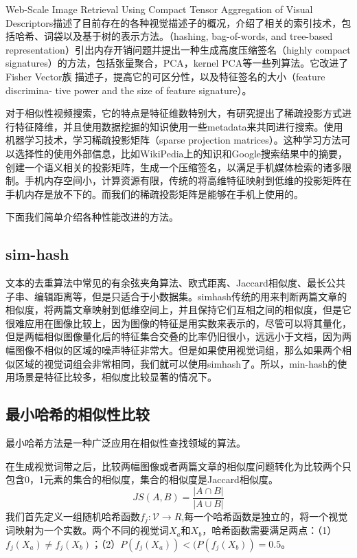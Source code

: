 Web-Scale Image Retrieval Using Compact Tensor Aggregation of Visual Descriptors\cite{Negrel:2013ur}描述了目前存在的各种视觉描述子的概况，介绍了相关的索引技术，包括哈希、词袋以及基于树的表示方法。（hashing, bag-of-words, and tree-based representation）引出内存开销问题并提出一种生成高度压缩签名（highly compact signatures）的方法，包括张量聚合，PCA，kernel PCA等一些列算法。它改进了Fisher Vector族 描述子，提高它的可区分性，以及特征签名的大小（feature discrimina- tive power and the size of feature signature）。

对于相似性视频搜索，它的特点是特征维数特别大，有研究提出了稀疏投影方式进行特征降维，并且使用数据挖掘的知识使用一些metadata来共同进行搜索\cite{Wu:2013tb}。使用机器学习技术，学习稀疏投影矩阵（sparse projection matrices）。这种学习方法可以选择性的使用外部信息，比如WikiPedia上的知识和Google搜索结果中的摘要，创建一个语义相关的投影矩阵，生成一个压缩签名，以满足手机媒体检索的诸多限制。手机内存空间小，计算资源有限，传统的将高维特征映射到低维的投影矩阵在手机内存是放不下的。而我们的稀疏投影矩阵是能够在手机上使用的。

下面我们简单介绍各种性能改进的方法。

\subsection{sim-hash}
文本的去重算法中常见的有余弦夹角算法、欧式距离、Jaccard相似度、最长公共子串、编辑距离等，但是只适合于小数据集。simhash传统的用来判断两篇文章的相似度，将两篇文章映射到低维空间上，并且保持它们互相之间的相似度，但是它很难应用在图像比较上，因为图像的特征是用实数来表示的，尽管可以将其量化，但是两幅相似图像量化后的特征集合交叠的比率仍旧很小，远远小于文档，因为两幅图像不相似的区域的噪声特征非常大。但是如果使用视觉词组，那么如果两个相似区域的视觉词组会非常相同，我们就可以使用simhash了。所以，min-hash的使用场景是特征比较多，相似度比较显著的情况下。

\subsection{最小哈希的相似性比较}
最小哈希方法是一种广泛应用在相似性查找领域的算法。

在生成视觉词带之后，比较两幅图像或者两篇文章的相似度问题转化为比较两个只包含0，1元素的集合的相似度，集合的相似度是Jaccard相似度。
\[JS(A,B)=\frac{|A\cap{B}|}{|A\cup{B}|}\]
我们首先定义一组随机哈希函数\(f_j:\mathcal{V} \to R\),每一个哈希函数是独立的，将一个视觉词映射为一个实数。两个不同的视觉词\(X_a\)和\(X_b\)，哈希函数需要满足两点：（1）\(f_j(X_a)\neq f_j(X_b)\)；（2）\(P(f_j(X_a)) < (P(f_j(X_b)) = 0.5\)。

